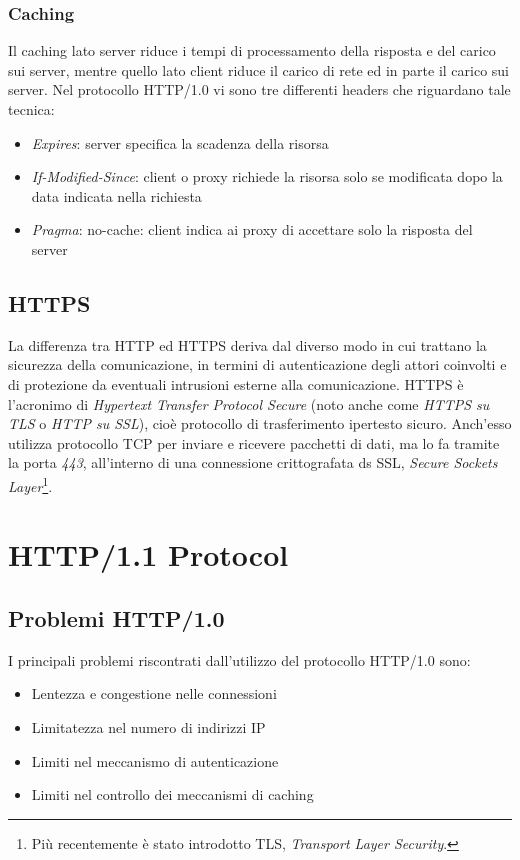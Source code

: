 \documentclass[a4paper,11pt]{article}
\begin{document}
\subsubsection{Caching}
Il caching lato server riduce i tempi di processamento della risposta e del carico sui server, mentre quello lato client riduce il carico di rete ed in parte il carico sui server.\newline
Nel protocollo HTTP/1.0 vi sono tre differenti headers che riguardano tale tecnica:
\begin{itemize}
    \item \textit{Expires}: server specifica la scadenza della risorsa
    \item \textit{If-Modified-Since}: client o proxy richiede la risorsa solo se modificata dopo la data indicata nella richiesta
    \item \textit{Pragma}: no-cache: client indica ai proxy di accettare solo la risposta del server
\end{itemize}
\subsection{HTTPS}
La differenza tra HTTP ed HTTPS deriva dal diverso modo in cui trattano la sicurezza della comunicazione, in termini di autenticazione degli attori coinvolti e di protezione da eventuali intrusioni esterne alla comunicazione.\newline
HTTPS è l’acronimo di \textit{Hypertext Transfer Protocol Secure} (noto anche come \textit{HTTPS su TLS} o \textit{HTTP su SSL}), cioè protocollo di trasferimento ipertesto sicuro.\newline
Anch’esso utilizza protocollo TCP per inviare e ricevere pacchetti di dati, ma lo fa tramite la porta \textit{443}, all’interno di una connessione crittografata ds SSL, \textit{Secure Sockets Layer}\footnote{Più recentemente è stato introdotto TLS, \textit{Transport Layer Security}.}.
\pagebreak
\section{HTTP/1.1 Protocol}
\subsection{Problemi HTTP/1.0}
I principali problemi riscontrati dall'utilizzo del protocollo HTTP/1.0 sono:
\begin{itemize}
    \item Lentezza e congestione nelle connessioni
    \item Limitatezza nel numero di indirizzi IP
    \item Limiti nel meccanismo di autenticazione
    \item Limiti nel controllo dei meccanismi di caching
\end{itemize}
\end{document}
